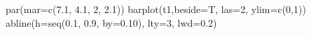\begin{Schunk}
\begin{Sinput}
 par(mar=c(7.1, 4.1, 2, 2.1))
 barplot(t1,beside=T, las=2, ylim=c(0,1))
 abline(h=seq(0.1, 0.9, by=0.10), lty=3,  lwd=0.2)
\end{Sinput}
\end{Schunk}
